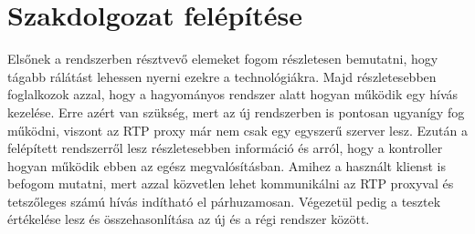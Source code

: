 \section{Szakdolgozat felépítése}

Elsőnek a rendszerben résztvevő elemeket fogom részletesen bemutatni, hogy 
tágabb rálátást lehessen nyerni ezekre a technológiákra. Majd részletesebben 
foglalkozok azzal, hogy a hagyományos rendszer alatt hogyan működik egy hívás 
kezelése. Erre azért van szükség, mert az új rendszerben is pontosan ugyanígy fog 
működni, viszont az RTP proxy már nem csak egy egyszerű szerver lesz. 
Ezután a felépített rendszerről lesz részletesebben információ és arról, hogy a
kontroller hogyan működik ebben az egész megvalósításban. Amihez a használt
klienst is befogom mutatni, mert azzal közvetlen lehet kommunikálni az RTP proxyval
és tetszőleges számú hívás indítható el párhuzamosan. Végezetül pedig 
a tesztek értékelése lesz és összehasonlítása az új és a régi rendszer között. 